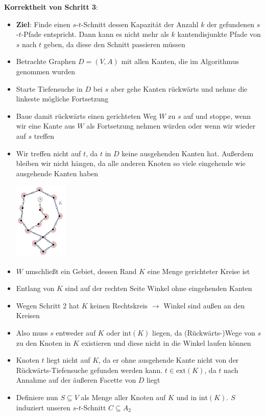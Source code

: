 \textbf{Korrektheit von Schritt 3}:
\begin{itemize}
	\item \textbf{Ziel}: Finde einen $s$-$t$-Schnitt dessen Kapazität der Anzahl $k$ der gefundenen $s$-$t$-Pfade entspricht. Dann kann es nicht mehr als $k$ kantendisjunkte Pfade von $s$ nach $t$ geben, da diese den Schnitt passieren müssen
	\item Betrachte Graphen $D = (V, A)$ mit allen Kanten, die im Algorithmus genommen wurden
	\item Starte Tiefensuche in $D$ bei $s$ aber gehe Kanten rückwärts und nehme die linkeste mögliche Fortsetzung
	\item Baue damit rückwärts einen gerichteten Weg $W$ zu $s$ auf und stoppe, wenn wir eine Kante aus $W$ als Fortsetzung nehmen würden oder wenn wir wieder auf $s$ treffen
	\item Wir treffen nicht auf $t$, da $t$ in $D$ keine ausgehenden Kanten hat. Außerdem bleiben wir nicht hängen, da alle anderen Knoten so viele eingehende wie ausgehende Kanten haben
	\begin{center}
		\includegraphics[width=0.2\textwidth]{images/menger-7.png}
	\end{center}
	\item $W$ umschließt ein Gebiet, dessen Rand $K$ eine Menge gerichteter Kreise ist
	\item Entlang von $K$ sind auf der rechten Seite Winkel ohne eingehenden Kanten
	\item Wegen Schritt 2 hat $K$ keinen Rechtskreis $\rightarrow$ Winkel sind außen an den Kreisen
	\item Also muss $s$ entweder auf $K$ oder $\text{int}(K)$ liegen, da (Rückwärts-)Wege von $s$ zu den Knoten in $K$ existieren und diese nicht in die Winkel laufen können
	\item Knoten $t$ liegt nicht auf $K$, da er ohne ausgehende Kante nicht von der Rückwärts-Tiefensuche gefunden werden kann. $t\in\text{ext}(K)$, da $t$ nach Annahme auf der äußeren Facette von $D$ liegt
	\item Definiere nun $S\subseteq V$ als Menge aller Knoten auf $K$ und in $\text{int}(K)$. $S$ induziert unseren $s$-$t$-Schnitt $C\subseteq A_2$

\end{itemize}
